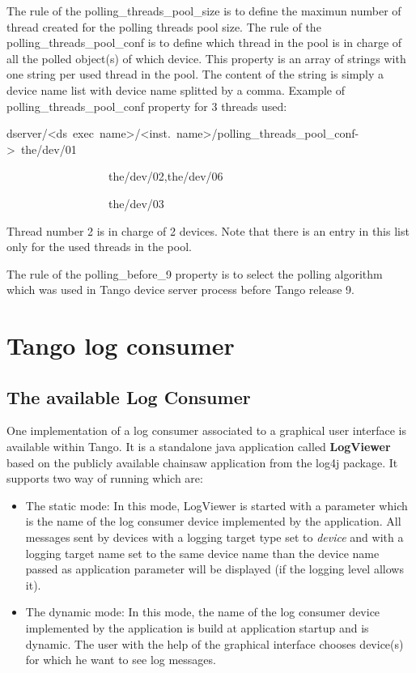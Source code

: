 \vspace{0.3cm}


The rule of the polling\_threads\_pool\_size
is to define the maximun number of thread created for the polling
threads pool size. The rule of the polling\_threads\_pool\_conf
is to define which thread in the pool is in charge of all the polled
object(s) of which device. This property is an array of strings with
one string per used thread in the pool. The content of the string
is simply a device name list with device name splitted by a comma.
Example of polling\_threads\_pool\_conf property for 3 threads used:
\begin{lyxcode}
dserver/<ds~exec~name>/<inst.~name>/polling\_threads\_pool\_conf->~the/dev/01

~~~~~~~~~~~~~~~~~~the/dev/02,the/dev/06

~~~~~~~~~~~~~~~~~~the/dev/03
\end{lyxcode}
Thread number 2 is in charge of 2 devices. Note that there is an entry
in this list only for the used threads in the pool.

The rule of the polling\_before\_9
property is to select the polling algorithm which was used in Tango
device server process before Tango release 9.


\section{Tango log consumer \label{sec:Tango-log-consumer}}


\subsection{The available Log Consumer}

One implementation of a log consumer associated to a graphical user
interface is available within Tango. It is a standalone java application
called \textbf{LogViewer} based on the publicly available chainsaw
application from the log4j package. It supports two way of running
which are:
\begin{itemize}
\item The static mode: In this mode, LogViewer is started with a parameter
which is the name of the log consumer device implemented by the application.
All messages sent by devices with a logging target type set to \emph{device}
and with a logging target name set to the same device name than the
device name passed as application parameter will be displayed (if
the logging level allows it).
\item The dynamic mode: In this mode, the name of the log consumer device
implemented by the application is build at application startup and
is dynamic. The user with the help of the graphical interface chooses
device(s) for which he want to see log messages.
\end{itemize}

